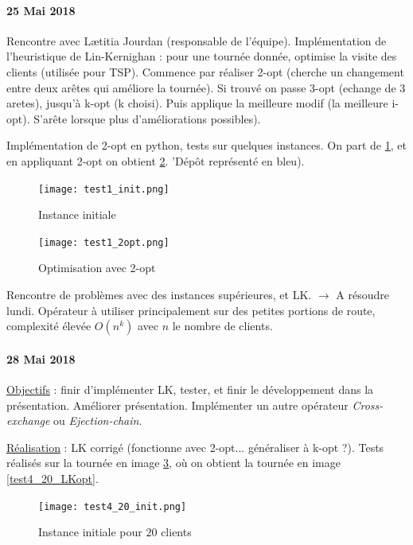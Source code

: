 \documentclass[a4paper,11pt]{article}%
\begin{document}
\paragraph*{25 Mai 2018}

Rencontre avec Lætitia Jourdan (responsable de l'équipe). Implémentation de l'heuristique de Lin-Kernighan : pour une tournée donnée, optimise la visite des clients (utilisée pour TSP). Commence par réaliser 2-opt (cherche un changement entre deux arêtes qui améliore la tournée). Si trouvé on passe 3-opt (echange de 3 aretes), jusqu'à k-opt (k choisi). Puis applique la meilleure modif (la meilleure i-opt). S'arête lorsque plus d'améliorations possibles). 

Implémentation de 2-opt en python, tests sur quelques instances. On part de \ref{test1}, et en appliquant 2-opt on obtient \ref{test1_2opt}. 'Dépôt représenté en bleu). 

\begin{figure}[ht]
	\centering
	\texttt{[image: test1\_init.png]}
	\caption{Instance initiale}
	\label{test1}
\end{figure}

\begin{figure}[ht]
	\centering
	\texttt{[image: test1\_2opt.png]}
	\caption{Optimisation avec 2-opt}
	\label{test1_2opt}
\end{figure}

Rencontre de problèmes avec des instances supérieures, et LK. $\rightarrow$ A résoudre lundi. Opérateur à utiliser principalement sur des petites portions de route, complexité élevée $O(n^k)$ avec $n$ le nombre de clients. 

\paragraph*{28 Mai 2018}

\underline{Objectifs} : finir d'implémenter LK, tester, et finir le développement dans la présentation. Améliorer présentation. Implémenter un autre opérateur \emph{Cross-exchange} ou \emph{Ejection-chain}.

\underline{Réalisation} :  LK corrigé (fonctionne avec 2-opt... généraliser à k-opt ?). Tests réalisés sur la tournée en image \ref{test4_20_init}, où on obtient la tournée en image \ref{test4_20_LKopt}.

\begin{figure}[ht]
\centering
\texttt{[image: test4\_20\_init.png]}
	\caption{Instance initiale pour $20$ clients}
	\label{test4_20_init}
\end{figure}
\end{document}
